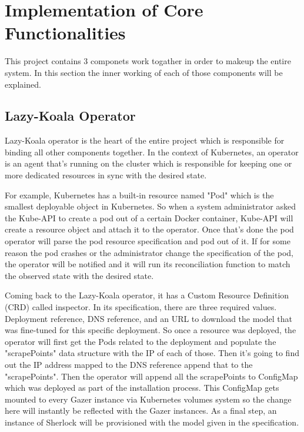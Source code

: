 \section{Implementation of Core Functionalities}

This project contains 3 componets work togather in order to makeup the entire system. In this section the inner working of each of those components will be explained.

\subsection{Lazy-Koala Operator}

Lazy-Koala operator is the heart of the entire project which is responsible for binding all other components together. In the context of Kubernetes, an operator is an agent that's running on the cluster which is responsible for keeping one or more dedicated resources in sync with the desired state. 

For example, Kubernetes has a built-in resource named "Pod" which is the smallest deployable object in Kubernetes. So when a system administrator asked the Kube-API to create a pod out of a certain Docker container, Kube-API will create a resource object and attach it to the operator. Once that's done the pod operator will parse the pod resource specification and pod out of it. If for some reason the pod crashes or the administrator change the specification of the pod, the operator will be notified and it will run its reconciliation function to match the observed state with the desired state.

Coming back to the Lazy-Koala operator, it has a Custom Resource Definition (CRD) called inspector. In its specification, there are three required values. Deployment reference, DNS reference, and an URL to download the model that was fine-tuned for this specific deployment. So once a resource was deployed, the operator will first get the Pods related to the deployment and populate the "scrapePoints" data structure
with the IP of each of those. Then it's going to find out the IP address mapped to the DNS reference append that to the "scrapePoints". Then the operator will append all the scrapePoints to ConfigMap which was deployed as part of the installation process. This ConfigMap gets mounted to every Gazer instance via Kubernetes volumes system so the change here will instantly be reflected with the Gazer instances. As a final step, an instance of Sherlock will be provisioned with the model given in the specification.

